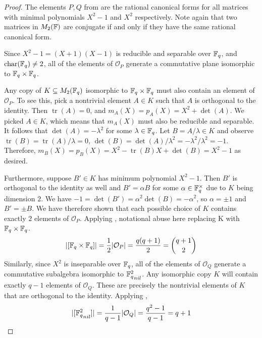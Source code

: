 \documentclass{amsart}
\begin{document}
\begin{proof}
    The elements $P, Q$ from  are the rational canonical forms for all matrices with minimal polynomials $X^2 - 1$ and $X^2$ respectively. Note again that two matrices in $M_2(\protect\mathbb{F})$ are conjugate if and only if they have the same rational canonical form.

    Since $X^2 - 1 = (X + 1)(X - 1)$ is reducible and separable over $\protect\mathbb{F}_q$, and $\operatorname{char}(\protect\mathbb{F}_q) \neq 2$, all of the elements of $\mathcal{O}_P$ generate a commutative plane isomorphic to $\protect\mathbb{F}_q \times \protect\mathbb{F}_q$.

    Any copy of $K \subseteq M_2(\protect\mathbb{F}_q)$ isomorphic to $\protect\mathbb{F}_q \times \protect\mathbb{F}_q$ must also contain an element of $\mathcal{O}_P$. To see this, pick a nontrivial element $A \in K$ such that $A$ is orthogonal to the identity. Then $\operatorname{tr}(A) = 0$, and $m_A(X) = p_A(X) = X^2 + \det(A)$. We picked $A \in K$, which means that $m_A(X)$ must also be reducible and separable. It follows that $\det(A) = -\lambda^2$ for some $\lambda \in \protect\mathbb{F}_q$. Let $B = A/\lambda \in K$ and observe $\operatorname{tr}(B) = \operatorname{tr}(A)/\lambda = 0$, $\det(B) = \det(A)/\lambda^2 = -\lambda^2/\lambda^2 = -1$. Therefore, $m_B(X) = p_B(X) = X^2 -\operatorname{tr}(B) X + \det(B) = X^2 -1$ as desired.

    Furthermore, suppose $B' \in K$ has minimum polynomial $X^2 - 1$. Then $B'$ is orthogonal to the identity as well and $B' = \alpha B$ for some $\alpha \in \protect\mathbb{F}_q^{\times}$ due to $K$ being dimension $2$. We have $-1 = \det(B') = \alpha^2 \det(B) = -\alpha^2$, so $\alpha = \pm 1$ and $B' = \pm B$. We have therefore shown that each possible choice of $K$ contains exactly $2$ elements of $\mathcal{O}_P$. Applying ,
    {\color{blue} notational abuse here replacing K with $\protect\mathbb{F}_q \times \protect\mathbb{F}_q$}. 
    \begin{align*}
        |[\protect\mathbb{F}_q \times \protect\mathbb{F}_q]| = \frac{1}{2}|\mathcal{O}_P|
                  = \frac{q(q+1)}{2}
                  = \binom{q + 1}{2}
    \end{align*}
    Similarly, since $X^2$ is inseparable over $\protect\mathbb{F}_q$, all of the elements of $\mathcal{O}_Q$ generate a commutative subalgebra isomorphic to ${\protect\mathbb{F}_q^2}_{nil}$. Any isomorphic copy $K$ will contain exactly $q - 1$ elements of $\mathcal{O}_Q$. These are precisely the nontrivial elements of $K$ that are orthogonal to the identity. Applying ,
    \begin{align*}
        |[{\protect\mathbb{F}_q^2}_{nil}]| = \frac{1}{q-1}|\mathcal{O}_Q|
                            = \frac{q^2-1}{q-1}
                            = q+1
    \end{align*}


\end{proof}
\end{document}
